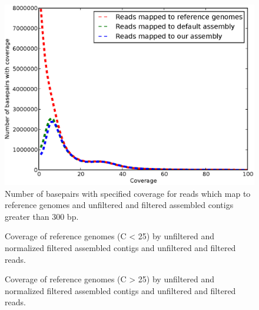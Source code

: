 \documentclass{pnastwo}
\begin{document}
\begin{figure}
\centerline{\includegraphics[width=.7\textwidth]{./figures/coverage.eps}}
\caption{Number of basepairs with specified coverage for reads which
  map to reference genomes and unfiltered and filtered assembled
  contigs greater than 300 bp.}
\label{coveragehmp}
\end{figure}

\begin{figure}
\caption{Coverage of reference genomes (C < 25) by unfiltered and normalized filtered
  assembled contigs and unfiltered and filtered reads.}
\label{coverage1}
\end{figure}

\begin{figure}
\caption{Coverage of reference genomes (C > 25) by unfiltered and normalized filtered
  assembled contigs and unfiltered and filtered reads.}
\label{coverage2}
\end{figure}
\end{document}
